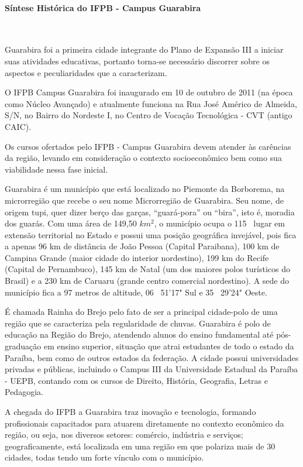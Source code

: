 \paragraph{Síntese Histórica do IFPB - Campus Guarabira}\

Guarabira foi a primeira cidade integrante do Plano de Expansão III a iniciar suas atividades educativas, portanto torna-se necessário discorrer sobre os aspectos e peculiaridades que a caracterizam.

O IFPB Campus Guarabira foi inaugurado em 10 de outubro de 2011 (na época como Núcleo Avançado) e atualmente funciona na Rua José Américo de Almeida, S/N, no Bairro do Nordeste I, no Centro de Vocação Tecnológica - CVT (antigo CAIC).

Os cursos ofertados pelo IFPB - Campus Guarabira devem atender às carências da região, levando em consideração o contexto socioeconômico bem como sua viabilidade nessa fase inicial.

	Guarabira é um município que está localizado no Piemonte da Borborema, na microrregião que recebe o seu nome Microrregião de Guarabira. Seu nome, de origem tupi, quer dizer berço das garças, ``guará-pora'' ou ``bira'', isto é, moradia dos guarás. Com uma área de 149,50 $km^2$, o município ocupa o 115~{\degree} lugar em extensão territorial no Estado e possui uma posição geográfica invejável, pois fica a apenas 96 km de distância de João Pessoa (Capital Paraibana), 100 km de Campina Grande (maior cidade do interior nordestino), 199 km do Recife (Capital de Pernambuco), 145 km de Natal (um dos maiores polos turísticos do Brasil) e a 230 km de Caruaru (grande centro comercial nordestino). A sede do município fica a 97 metros de altitude, 06~{\degree} 51’17" Sul e 35~{\degree} 29’24" Oeste.

	É chamada Rainha do Brejo pelo fato de ser a principal cidade-polo de uma região que se caracteriza pela regularidade de chuvas. Guarabira é polo de educação na Região do Brejo, atendendo alunos do ensino fundamental até pós-graduação em ensino superior, situação que atrai estudantes de todo o estado da Paraíba, bem como de outros estados da federação. A cidade possui universidades privadas e públicas, incluindo o Campus III da Universidade Estadual da Paraíba - UEPB, contando com os cursos de Direito, História, Geografia, Letras e Pedagogia.

	A chegada do IFPB a Guarabira traz inovação e tecnologia, formando profissionais capacitados para atuarem diretamente no contexto econômico da região, ou seja, nos diversos setores: comércio, indústria e serviços; geograficamente, está localizada em uma região em que polariza mais de 30 cidades, todas tendo um forte vínculo com o município.

